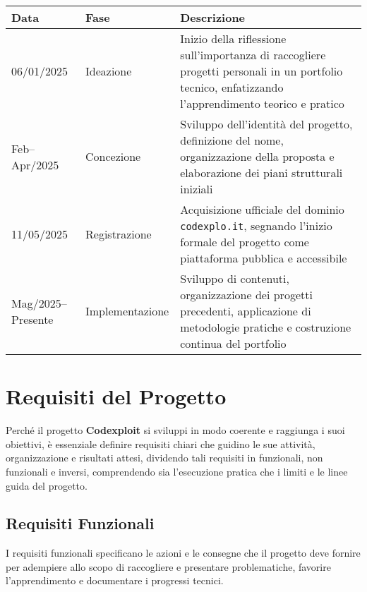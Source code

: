 \documentclass[10pt, a4paper, oneside]{article}
\begin{document}
\begin{table}[ht]
    \centering
    \setlength\tabcolsep{6pt}
    \begin{tabular}{ |l|l|p{6.8cm}| }
        \hline
        \bfseries Data & \bfseries Fase & \bfseries Descrizione \\
        \hline
        06/01/2025 & Ideazione & Inizio della riflessione sull’importanza di raccogliere progetti personali in un portfolio tecnico, enfatizzando l’apprendimento teorico e pratico \\
        \hline
        Feb–Apr/2025 & Concezione & Sviluppo dell’identità del progetto, definizione del nome, organizzazione della proposta e elaborazione dei piani strutturali iniziali \\
        \hline
        11/05/2025 & Registrazione & Acquisizione ufficiale del dominio \texttt{codexplo.it}, segnando l’inizio formale del progetto come piattaforma pubblica e accessibile \\
        \hline
        Mag/2025–Presente & Implementazione & Sviluppo di contenuti, organizzazione dei progetti precedenti, applicazione di metodologie pratiche e costruzione continua del portfolio \\
        \hline
    \end{tabular}
    \caption{\fontsize{10pt}{11pt}}
    \label{table:history}
\end{table}
\newpage

\section{Requisiti del Progetto}

Perché il progetto \textbf{Codexploit} si sviluppi in modo coerente e raggiunga i suoi obiettivi, è essenziale definire requisiti chiari che guidino le sue attività, organizzazione e risultati attesi, dividendo tali requisiti in funzionali, non funzionali e inversi, comprendendo sia l’esecuzione pratica che i limiti e le linee guida del progetto.

\subsection{Requisiti Funzionali}

I requisiti funzionali specificano le azioni e le consegne che il progetto deve fornire per adempiere allo scopo di raccogliere e presentare problematiche, favorire l’apprendimento e documentare i progressi tecnici.
\end{document}
